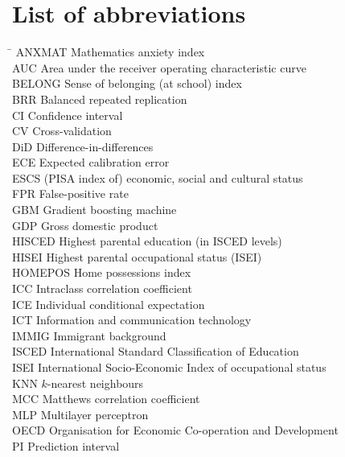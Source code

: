 \documentclass[11pt,a4paper]{article}
\begin{document}
\section*{List of abbreviations}
\nolinenumbers
\begingroup
\small
\begin{tabbing}
\hspace*{2.6cm}\= \kill
ANXMAT \> Mathematics anxiety index\\
AUC \> Area under the receiver operating characteristic curve\\
BELONG \> Sense of belonging (at school) index\\
BRR \> Balanced repeated replication\\
CI \> Confidence interval\\
CV \> Cross-validation\\
DiD \> Difference-in-differences\\
ECE \> Expected calibration error\\
ESCS \> (PISA index of) economic, social and cultural status\\
FPR \> False-positive rate\\
GBM \> Gradient boosting machine\\
GDP \> Gross domestic product\\
HISCED \> Highest parental education (in ISCED levels)\\
HISEI \> Highest parental occupational status (ISEI)\\
HOMEPOS \> Home possessions index\\
ICC \> Intraclass correlation coefficient\\
ICE \> Individual conditional expectation\\
ICT \> Information and communication technology\\
IMMIG \> Immigrant background\\
ISCED \> International Standard Classification of Education\\
ISEI \> International Socio-Economic Index of occupational status\\
KNN \> $k$-nearest neighbours\\
MCC \> Matthews correlation coefficient\\
MLP \> Multilayer perceptron\\
OECD \> Organisation for Economic Co-operation and Development\\
PI \> Prediction interval\\

\end{tabbing}
\end{document}
